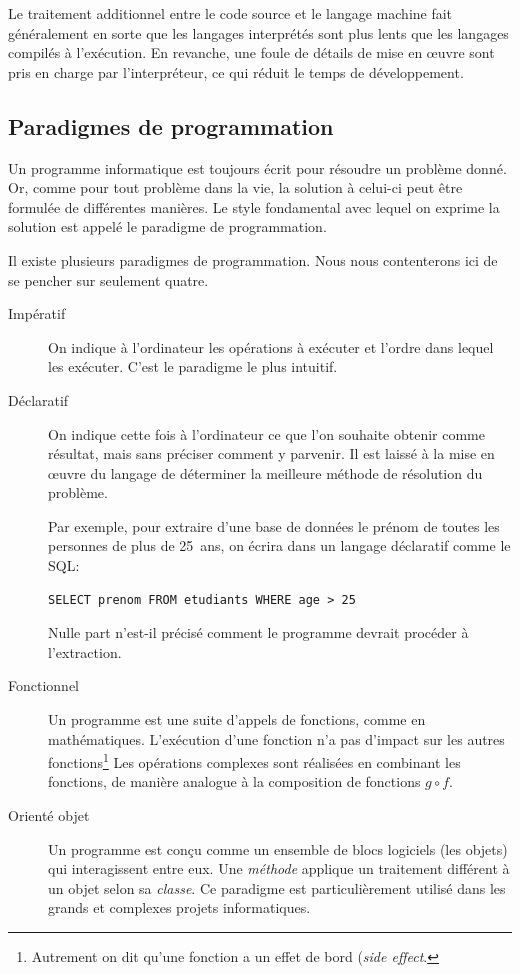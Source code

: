 Le traitement additionnel entre le code source et le langage machine
fait généralement en sorte que les langages interprétés sont plus
lents que les langages compilés à l'exécution. En revanche, une foule
de détails de mise en œuvre sont pris en charge par l'interpréteur, ce
qui réduit le temps de développement.


\subsection{Paradigmes de programmation}
\label{sec:informatique:programmer:paradigmes}

Un programme informatique est toujours écrit pour résoudre un problème
donné. Or, comme pour tout problème dans la vie, la solution à
celui-ci peut être formulée de différentes manières. Le style
fondamental avec lequel on exprime la solution est appelé le
paradigme de programmation.

Il existe plusieurs paradigmes de programmation. Nous nous
contenterons ici de se pencher sur seulement quatre.

\begin{description}
\item[Impératif]  On indique à l'ordinateur
  les opérations à exécuter et l'ordre dans lequel les exécuter. C'est
  le paradigme le plus intuitif.
\item[Déclaratif]  On indique cette fois à
  l'ordinateur ce que l'on souhaite obtenir comme résultat, mais sans
  préciser comment y parvenir. Il est laissé à la mise en œuvre du
  langage de déterminer la meilleure méthode de résolution du
  problème.

  Par exemple, pour extraire d'une base de données  le
  prénom de toutes les personnes de plus de 25~ans, on écrira dans un
  langage déclaratif comme le SQL:
\begin{Schunk}
\begin{Verbatim}
SELECT prenom FROM etudiants WHERE age > 25
\end{Verbatim}
\end{Schunk}
  Nulle part n'est-il précisé comment le programme devrait procéder à
  l'extraction.
\item[Fonctionnel]  Un programme est une
  suite d'appels de fonctions, comme en mathématiques. L'exécution
  d'une fonction n'a pas d'impact sur les autres fonctions\footnote{%
    Autrement on dit qu'une fonction a un effet de bord (\emph{side
      effect}.} %
  Les opérations complexes sont réalisées en combinant les fonctions,
  de manière analogue à la composition de fonctions $g \circ f$.
\item[Orienté objet]  Un programme est
  conçu comme un ensemble de blocs logiciels (les objets) qui
  interagissent entre eux. Une \emph{méthode} applique un traitement
  différent à un objet selon sa \emph{classe}. Ce paradigme est
  particulièrement utilisé dans les grands et complexes projets
  informatiques.
\end{description}

